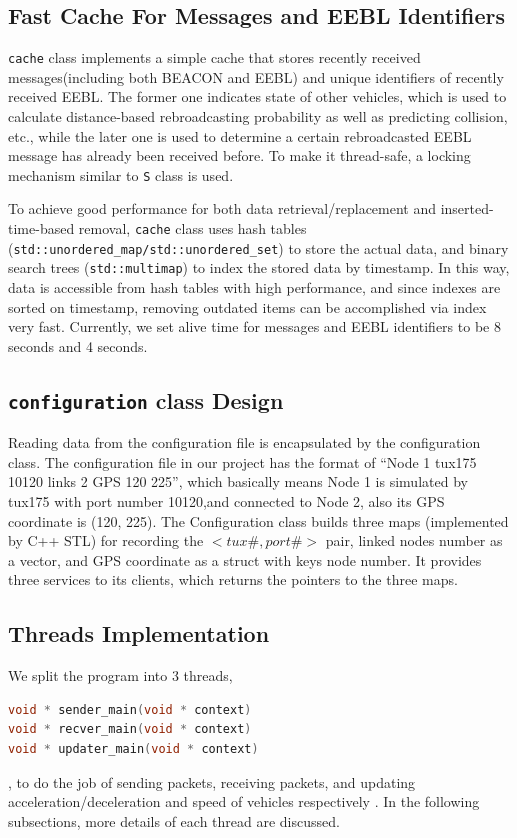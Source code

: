 \documentclass[twocolumn]{article}
\begin{document}
\subsection{Fast Cache For Messages and EEBL Identifiers}
\label{sec:class_cache}
\par{{\tt cache} class implements a simple cache that stores recently received messages(including both BEACON and EEBL) and unique identifiers of recently received EEBL. The former one indicates state of other vehicles, which is used to calculate distance-based rebroadcasting probability as well as predicting collision, etc., while the later one is used to determine a certain rebroadcasted EEBL message has already been received before. To make it thread-safe, a locking mechanism similar to {\tt S} class is used.}
\par{To achieve good performance for both data retrieval/replacement and inserted-time-based removal, {\tt cache} class uses hash tables ({\tt std::unordered\_map/std::unordered\_set}) to store the actual data, and binary search trees ({\tt std::multimap}) to index the stored data by timestamp. In this way, data is accessible from hash tables with high performance, and since indexes are sorted on timestamp, removing outdated items can be accomplished via index very fast. Currently, we set alive time for messages and EEBL identifiers to be 8 seconds and 4 seconds.}
\subsection{{\tt configuration} class Design}
\par{Reading data from the configuration file is encapsulated by the configuration class. The configuration file in our project has the format of “Node 1 tux175 10120 links 2 GPS 120 225”, which basically means Node 1 is simulated by tux175 with port number 10120,and connected to Node 2, also its GPS coordinate is (120, 225). The Configuration class builds three maps (implemented by C++ STL) for recording the $<tux\#, port\#>$ pair, linked nodes number as a vector, and GPS coordinate as a struct with keys node number. It provides three services to its clients, which returns the pointers to the three maps.}
\subsection{Threads Implementation}
\par{We split the program into 3 threads, 
\begin{lstlisting}[language=C++,keywordstyle=\color{blue}]
void * sender_main(void * context)
void * recver_main(void * context)
void * updater_main(void * context)
\end{lstlisting}
, to do the job of sending packets, receiving packets, and updating acceleration/deceleration and speed of vehicles respectively . In the following subsections, more details of each thread are discussed.}
\end{document}

